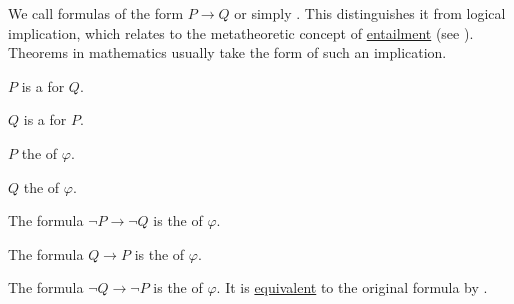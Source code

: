 \begin{definition}\label{def:material_implication}
  We call formulas of the form \( P \rightarrow Q \)  or simply . This distinguishes it from logical implication, which relates to the metatheoretic concept of \hyperref[def:propositional_semantics/entailment]{entailment} (see \cite{MathSE:material_vs_logical_implication}). Theorems in mathematics usually take the form of such an implication.

  \begin{DefEnum}
     \( P \) is a  for \( Q \).

     \( Q \) is a  for \( P \).

     \( P \) the  of \( \varphi \).

     \( Q \) the  of \( \varphi \).

     The formula \( \neg P \rightarrow \neg Q \) is the  of \( \varphi \).

     The formula \( Q \rightarrow P \) is the  of \( \varphi \).

     The formula \( \neg Q \rightarrow \neg P \) is the  of \( \varphi \). It is \hyperref[def:propositional_semantics/equivalence]{equivalent} to the original formula by .
  \end{DefEnum}
\end{definition}


